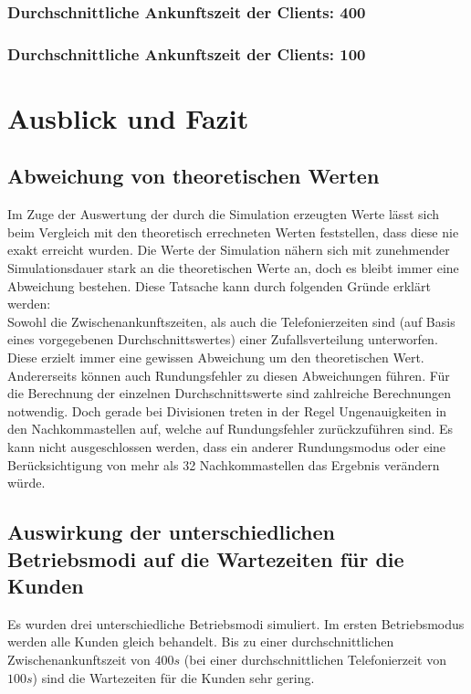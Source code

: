 \subsubsection{Durchschnittliche Ankunftszeit der Clients: 400}
\subsubsection{Durchschnittliche Ankunftszeit der Clients: 100}

\section{Ausblick und Fazit}
\subsection{Abweichung von theoretischen Werten}
Im Zuge der Auswertung der durch die Simulation erzeugten Werte lässt sich beim Vergleich mit den theoretisch errechneten Werten feststellen, dass diese nie exakt erreicht wurden. Die Werte der Simulation nähern sich mit zunehmender Simulationsdauer stark an die theoretischen Werte an, doch es bleibt immer eine Abweichung bestehen. Diese Tatsache kann durch folgenden Gründe erklärt werden: \\

Sowohl die Zwischenankunftszeiten, als auch die Telefonierzeiten sind (auf Basis eines vorgegebenen Durchschnittswertes) einer Zufallsverteilung unterworfen. Diese erzielt immer eine gewissen Abweichung um den theoretischen Wert. \\

Andererseits können auch Rundungsfehler zu diesen Abweichungen führen. Für die Berechnung der einzelnen Durchschnittswerte sind zahlreiche Berechnungen notwendig. Doch gerade bei Divisionen treten in der Regel Ungenauigkeiten in den Nachkommastellen auf, welche auf Rundungsfehler zurückzuführen sind. Es kann nicht ausgeschlossen werden, dass ein anderer Rundungsmodus oder eine Berücksichtigung von mehr als 32 Nachkommastellen das Ergebnis verändern würde.\\

\subsection{Auswirkung der unterschiedlichen Betriebsmodi auf die Wartezeiten für die Kunden}
Es wurden drei unterschiedliche Betriebsmodi simuliert. Im ersten Betriebsmodus werden alle Kunden gleich behandelt. Bis zu einer durchschnittlichen Zwischenankunftszeit von $400s$ (bei einer durchschnittlichen Telefonierzeit von $100s$) sind die Wartezeiten für die Kunden sehr gering. 

